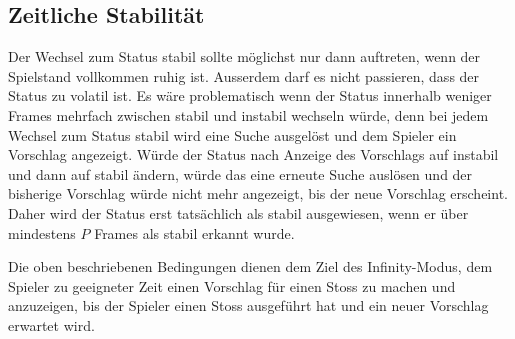 \subsection{Zeitliche Stabilität}
Der Wechsel zum Status stabil sollte möglichst nur dann auftreten, wenn der Spielstand vollkommen ruhig ist.
Ausserdem darf es nicht passieren, dass der Status zu volatil ist.
Es wäre problematisch wenn der Status innerhalb weniger Frames mehrfach zwischen stabil und instabil wechseln würde,
denn bei jedem Wechsel zum Status stabil wird eine Suche ausgelöst und dem Spieler ein Vorschlag angezeigt.
Würde der Status nach Anzeige des Vorschlags auf instabil und dann auf stabil ändern, würde das eine erneute
Suche auslösen und der bisherige Vorschlag würde nicht mehr angezeigt, bis der neue Vorschlag erscheint.
Daher wird der Status erst tatsächlich als stabil ausgewiesen, wenn er über mindestens $P$ Frames als stabil erkannt wurde.

Die oben beschriebenen Bedingungen dienen dem Ziel des Infinity-Modus, dem Spieler zu geeigneter Zeit
einen Vorschlag für einen Stoss zu machen und anzuzeigen, bis der Spieler einen Stoss ausgeführt hat
und ein neuer Vorschlag erwartet wird.
